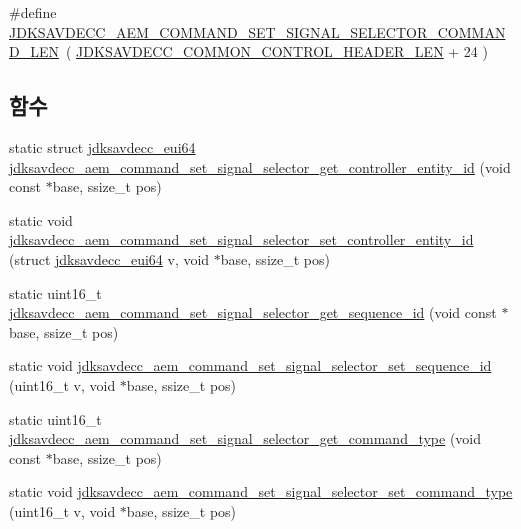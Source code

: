 \begin{DoxyCompactItemize}
\item 
\#define \hyperlink{group__command__set__signal__selector_ga83f59269adfc23a88c27c293398c953d}{J\+D\+K\+S\+A\+V\+D\+E\+C\+C\+\_\+\+A\+E\+M\+\_\+\+C\+O\+M\+M\+A\+N\+D\+\_\+\+S\+E\+T\+\_\+\+S\+I\+G\+N\+A\+L\+\_\+\+S\+E\+L\+E\+C\+T\+O\+R\+\_\+\+C\+O\+M\+M\+A\+N\+D\+\_\+\+L\+EN}~( \hyperlink{group__jdksavdecc__avtp__common__control__header_gaae84052886fb1bb42f3bc5f85b741dff}{J\+D\+K\+S\+A\+V\+D\+E\+C\+C\+\_\+\+C\+O\+M\+M\+O\+N\+\_\+\+C\+O\+N\+T\+R\+O\+L\+\_\+\+H\+E\+A\+D\+E\+R\+\_\+\+L\+EN} + 24 )
\end{DoxyCompactItemize}
\subsection*{함수}
\begin{DoxyCompactItemize}
\item 
static struct \hyperlink{structjdksavdecc__eui64}{jdksavdecc\+\_\+eui64} \hyperlink{group__command__set__signal__selector_ga060870755c3311e0be0882f4af555082}{jdksavdecc\+\_\+aem\+\_\+command\+\_\+set\+\_\+signal\+\_\+selector\+\_\+get\+\_\+controller\+\_\+entity\+\_\+id} (void const $\ast$base, ssize\+\_\+t pos)
\item 
static void \hyperlink{group__command__set__signal__selector_ga7d5ea5b9e63ada233b73a8654438bc0d}{jdksavdecc\+\_\+aem\+\_\+command\+\_\+set\+\_\+signal\+\_\+selector\+\_\+set\+\_\+controller\+\_\+entity\+\_\+id} (struct \hyperlink{structjdksavdecc__eui64}{jdksavdecc\+\_\+eui64} v, void $\ast$base, ssize\+\_\+t pos)
\item 
static uint16\+\_\+t \hyperlink{group__command__set__signal__selector_ga2691f7e41c8096dd05504497521eeca8}{jdksavdecc\+\_\+aem\+\_\+command\+\_\+set\+\_\+signal\+\_\+selector\+\_\+get\+\_\+sequence\+\_\+id} (void const $\ast$base, ssize\+\_\+t pos)
\item 
static void \hyperlink{group__command__set__signal__selector_gabc101e8a8c20d880c5922e43968bda9d}{jdksavdecc\+\_\+aem\+\_\+command\+\_\+set\+\_\+signal\+\_\+selector\+\_\+set\+\_\+sequence\+\_\+id} (uint16\+\_\+t v, void $\ast$base, ssize\+\_\+t pos)
\item 
static uint16\+\_\+t \hyperlink{group__command__set__signal__selector_ga5f96b0632d99e7d36af6f00e515fae48}{jdksavdecc\+\_\+aem\+\_\+command\+\_\+set\+\_\+signal\+\_\+selector\+\_\+get\+\_\+command\+\_\+type} (void const $\ast$base, ssize\+\_\+t pos)
\item 
static void \hyperlink{group__command__set__signal__selector_ga6ce21ab49ec689e55bea3c7d43917472}{jdksavdecc\+\_\+aem\+\_\+command\+\_\+set\+\_\+signal\+\_\+selector\+\_\+set\+\_\+command\+\_\+type} (uint16\+\_\+t v, void $\ast$base, ssize\+\_\+t pos)

\end{DoxyCompactItemize}
